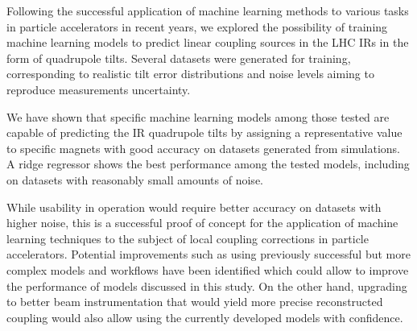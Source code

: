 Following the successful application of machine learning methods to various tasks in particle accelerators in recent years, we explored the possibility of training machine learning models to predict linear coupling sources in the LHC IRs in the form of quadrupole tilts.
Several datasets were generated for training, corresponding to realistic tilt error distributions and noise levels aiming to reproduce measurements uncertainty.

We have shown that specific machine learning models among those tested are capable of predicting the IR quadrupole tilts by assigning a representative value to specific magnets with good accuracy on datasets generated from simulations.
A ridge regressor shows the best performance among the tested models, including on datasets with reasonably small amounts of noise.

While usability in operation would require better accuracy on datasets with higher noise, this is a successful proof of concept for the application of machine learning techniques to the subject of local coupling corrections in particle accelerators.
Potential improvements such as using previously successful but more complex models and workflows have been identified which could allow to improve the performance of models discussed in this study.
On the other hand, upgrading to better beam instrumentation that would yield more precise reconstructed coupling  would also allow using the currently developed models with confidence.
